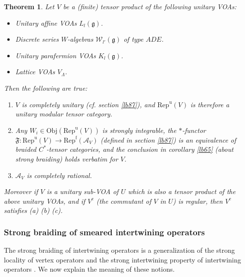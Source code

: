 \documentclass[12pt,a4paper]{article}
\theoremstyle{definition}
\theoremstyle{plain}
\newtheorem{thmn}{Theorem}
\newcommand{\fk}{\mathfrak}
\newcommand{\mc}{\mathcal}
\newcommand{\gk}{\mathfrak g}
\newcommand{\Repf}{\mathrm{Rep}^{\mathrm f}}
\newcommand{\RepuV}{\mathrm{Rep}^{\mathrm u}(V)}
\newcommand{\Obj}{\mathrm{Obj}}
\numberwithin{equation}{subsection}
\begin{document}
\begin{thmn}\label{lb94}
	Let $V$ be a (finite) tensor product of the following unitary VOAs:
	\begin{itemize}
		\item Unitary affine VOAs $L_l(\gk)$.
		\item Discrete series $W$-algebras $\mc W_{l'}(\gk)$ of type $ADE$.
		\item Unitary parafermion VOAs $K_l(\gk)$.
		\item Lattice VOAs $V_{\Lambda}$.
	\end{itemize}
Then  the following are true:
	
	\begin{enumerate}[label=(\alph*)]
		\item $V$ is completely unitary (cf. section \ref{lb87}), and  $\RepuV$ is therefore a unitary modular tensor category. 
		\item Any $W_i\in\Obj(\RepuV)$ is strongly integrable, the $*$-functor $\fk F:\RepuV\rightarrow\Repf(\mc A_V)$ (defined in section \ref{lb87}) is an equivalence of braided $C^*$-tensor categories, and the conclusion in corollary \ref{lb65} (about strong braiding) holds verbatim for $V$.
		\item $\mc A_V$ is completely rational.
	\end{enumerate}
	
	
	
	
	Moreover if $V$ is a unitary sub-VOA of $U$ which   is also a tensor product of the above unitary VOAs, and if  $V^c$ (the commutant of $V$ in $U$) is regular, then $V^c$ satisfies  (a) (b) (c).
\end{thmn}












\subsubsection*{Strong braiding of smeared intertwining operators}



The strong braiding of intertwining operators is  a generalization of the strong locality of vertex operators \cite{CKLW18} and the strong intertwining property of intertwining operators \cite{Gui19b}. We now explain the meaning of these notions.
\end{document}
